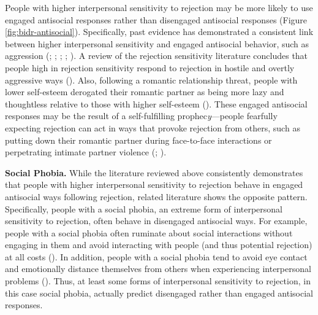\documentclass[
]{udthesis}
\begin{document}
People with higher interpersonal sensitivity to rejection may be more
likely to use engaged antisocial responses rather than disengaged
antisocial responses (Figure \ref{fig:bidr-antisocial}). Specifically,
past evidence has demonstrated a consistent link between higher
interpersonal sensitivity and engaged antisocial behavior, such as
aggression (; ; ; ; ).
A review of the rejection sensitivity literature concludes that people
high in rejection sensitivity respond to rejection in hostile and
overtly aggressive ways (). Also,
following a romantic relationship threat, people with lower self-esteem
derogated their romantic partner as being more lazy and thoughtless
relative to those with higher self-esteem
(). These engaged antisocial responses may
be the result of a self-fulfilling prophec\emph{y}---people fearfully
expecting rejection can act in ways that provoke rejection from others,
such as putting down their romantic partner during face-to-face
interactions or perpetrating intimate partner violence
(; ).

\textbf{Social Phobia.} While the literature reviewed above consistently
demonstrates that people with higher interpersonal sensitivity to
rejection behave in engaged antisocial ways following rejection, related
literature shows the opposite pattern. Specifically, people with a
social phobia, an extreme form of interpersonal sensitivity to
rejection, often behave in disengaged antisocial ways. For example,
people with a social phobia often ruminate about social interactions
without engaging in them and avoid interacting with people (and thus
potential rejection) at all costs
(). In addition, people with a
social phobia tend to avoid eye contact and emotionally distance
themselves from others when experiencing interpersonal problems
(). Thus, at least some forms of
interpersonal sensitivity to rejection, in this case social phobia,
actually predict disengaged rather than engaged antisocial responses.
\end{document}
